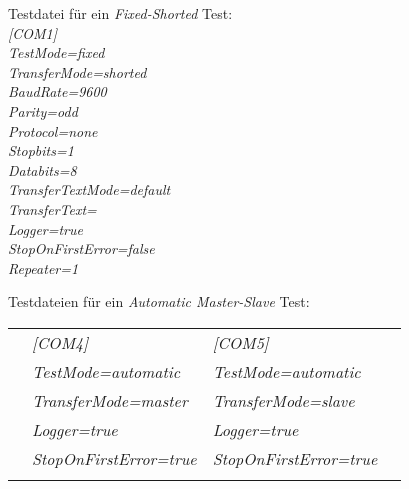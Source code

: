 Testdatei für ein \textit{Fixed-Shorted} Test:\\

\textit{
\hspace*{10mm}[COM1]\\
\hspace*{10mm}TestMode=fixed\\
\hspace*{10mm}TransferMode=shorted\\
\hspace*{10mm}BaudRate=9600\\
\hspace*{10mm}Parity=odd\\
\hspace*{10mm}Protocol=none\\
\hspace*{10mm}Stopbits=1\\
\hspace*{10mm}Databits=8\\
\hspace*{10mm}TransferTextMode=default\\
\hspace*{10mm}TransferText=\\
\hspace*{10mm}Logger=true\\
\hspace*{10mm}StopOnFirstError=false\\
\hspace*{10mm}Repeater=1\\
}

Testdateien für ein \textit{Automatic Master-Slave} Test:\\

\begin{tabular}{llll}
&\hspace*{5mm}\textit{[COM4]} & \textit{[COM5]}\\
&\hspace*{5mm}\textit{TestMode=automatic} & \textit{TestMode=automatic}\\
&\hspace*{5mm}\textit{TransferMode=master} & \textit{TransferMode=slave}\\
&\hspace*{5mm}\textit{Logger=true} & \textit{Logger=true}\\
&\hspace*{5mm}\textit{StopOnFirstError=true} & \textit{StopOnFirstError=true}\\\\
\end{tabular}


